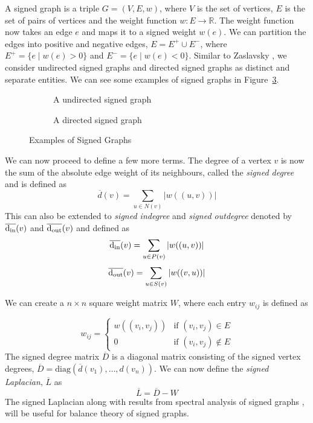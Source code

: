 A signed graph is a triple $G=(V,E,w)$, where $V$ is the set of vertices, $E$ is the set of pairs of vertices and the weight function $w:E \rightarrow \mathbb{R}$. The weight function now takes an edge $e$ and maps it to a signed weight $w(e)$. We can partition the edges into positive and negative edges, $E = E^{+}\cup E^{-}$, where $E^{+} = \{e \mid w(e)>0\}$ and $E^{-}=\{e \mid w(e)<0\}$. Similar to Zaslavsky \cite{zaslavsky1982signed}, we consider undirected signed graphs and directed signed graphs as distinct and separate entities. We can see some examples of signed graphs in Figure~\ref{fig:signed-graphs}.
\begin{figure}[!ht]
    \centering
    \begin{subfigure}{0.5\textwidth}
        \centering
        
        \caption{A undirected signed graph}
        \label{fig:signed-undirected}
    \end{subfigure}

    \begin{subfigure}{0.5\textwidth}
        \centering
        
        \caption{A directed signed graph}
        \label{fig:signed-directed graph}
    \end{subfigure}
    \caption{Examples of Signed Graphs}
    \label{fig:signed-graphs}
\end{figure}

We can now proceed to define a few more terms. The degree of a vertex $v$ is now the sum of the absolute edge weight of its neighbours, called the \textit{signed degree} and is defined as 
\[
    \overline{d}(v) = \sum_{u \in N(v)}|w((u,v))|
\] 
This can also be extended to \textit{signed indegree} and \textit{signed outdegree} denoted by $\overline{\operatorname*{d_{\text{in}}}}(v)$ and $\overline{\operatorname*{d_{\text{out}}}}(v)$ and defined as
\[
    \overline{\operatorname*{d_{\text{in}}}}(v)=\sum_{u \in P(v)}|w((u,v))|
\] 
\[
    \overline{\operatorname*{d_{\text{out}}}}(v)=\sum_{u \in S(v)}|w((v,u))|
\] 

We can create a $n \times n$ square weight matrix $W$, where each entry $w_{ij}$ is defined as 

\[ w_{ij} = 
\begin{cases}
    w((v_i,v_j)) & \text{if } (v_i,v_j) \in E \\
    0 & \text{if } (v_i,v_j) \notin E      
\end{cases}
\] 
The signed degree matrix $\overline{D}$ is a diagonal matrix consisting of the signed vertex degrees, $\overline{D} = \text{diag}(\overline{d}(v_{1}),\dots,d(v_n))$. We can now define the \textit{signed Laplacian}, $\overline{L}$ as 
\[ \overline{L} = \overline{D} - W\]
The signed Laplacian along with results from spectral analysis of signed graphs \cite{hou2005bounds,kunegis2010spectral}, will be useful for balance theory of signed graphs. 

